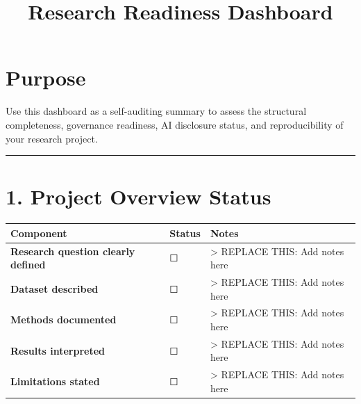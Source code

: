\documentclass[
]{report}
\title{Research Readiness Dashboard}
\author{}
\date{}
\renewcommand*\contentsname{Table of contents}
\newcommand\contentsname{Table of contents}
\begin{document}
\maketitle

\renewcommand*\contentsname{Table of contents}
{
\hypersetup{linkcolor=}
\setcounter{tocdepth}{2}
\tableofcontents
}

\chapter{Purpose}\label{purpose}

Use this dashboard as a self-auditing summary to assess the structural
completeness, governance readiness, AI disclosure status, and
reproducibility of your research project.

\begin{center}\rule{0.5\linewidth}{0.5pt}\end{center}

\chapter{1. Project Overview Status}\label{project-overview-status}

\begin{longtable}[]{@{}
  >{\raggedright\arraybackslash}p{}
  >{\raggedright\arraybackslash}p{}
  >{\raggedright\arraybackslash}p{}@{}}
\toprule\noalign{}
\begin{minipage}[b]{\linewidth}\raggedright
Component
\end{minipage} & \begin{minipage}[b]{\linewidth}\raggedright
Status
\end{minipage} & \begin{minipage}[b]{\linewidth}\raggedright
Notes
\end{minipage} \\
\midrule\noalign{}
\endhead
\bottomrule\noalign{}
\endlastfoot
\textbf{Research question clearly defined} & ☐ & \textgreater{} REPLACE
THIS: Add notes here \\
\textbf{Dataset described} & ☐ & \textgreater{} REPLACE THIS: Add notes
here \\
\textbf{Methods documented} & ☐ & \textgreater{} REPLACE THIS: Add notes
here \\
\textbf{Results interpreted} & ☐ & \textgreater{} REPLACE THIS: Add
notes here \\
\textbf{Limitations stated} & ☐ & \textgreater{} REPLACE THIS: Add notes
here \\
\end{longtable}
\end{document}
